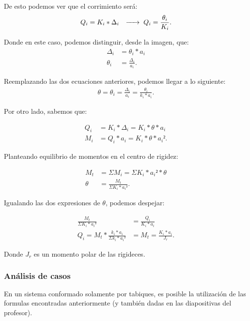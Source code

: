 \documentclass[../main.tex]{subfiles}
\begin{document}
De esto podemos ver que el corrimiento será:
\begin{align*}
  Q_i = K_i * \Delta_i \hspace{0.25cm} \xrightarrow{\hspace*{0.5cm}} \hspace{0.1cm} Q_i = \frac{\theta_i}{K_i}
.\end{align*}

Donde en este caso, podemos distinguir, desde la imagen, que:
\begin{align*}
  \Delta_i &= \theta_i * a_i \\[5pt]
  \theta_i &= \frac{\Delta_i}{a_i}
.\end{align*}

Reemplazando las dos ecuaciones anteriores, podemos llegar a lo siguiente:
\begin{align*}
  \theta = \theta_i = \frac{\Delta_i}{a_i} = \frac{\theta_i}{k_i*a_i}
.\end{align*}

Por otro lado, sabemos que:

\begin{align*}
  Q_i &= K_i * \Delta_i = K_i * \theta * a_i \\[5pt]
  M_i &= Q_i * a_i = K_i * \theta * a_i²
.\end{align*}

Planteando equilibrio de momentos en el centro de rigidez:

\begin{align*}
  M_t &= \Sigma M_i = \Sigma K_i * a_i² * \theta \\[5pt] 
  \theta &= \frac{M_t}{\Sigma K_i * a_i²}
.\end{align*}

Igualando las dos expresiones de $\theta$, podemos despejar:

 \begin{align*}
   \frac{M_t}{\Sigma K_i * a_i²} &= \frac{Q_i}{K_i * a_i} \\[5pt]
   Q_i = M_t * \frac{k_i*a_i}{\Sigma k_i * a_i²} &= M_t = \frac{K_i * a_i}{J_r}
.\end{align*}

Donde $J_r$ es un momento polar de las rigideces.

\subsubsection{Análisis de casos}

En un sistema conformado solamente por tabiques, es posible la utilización de
las formulas encontradas anteriormente (y también dadas en las diapositivas
del profesor).
\end{document}
